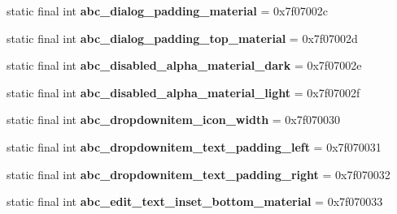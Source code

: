 \begin{DoxyCompactItemize}
\item 
\hypertarget{classandroid_1_1support_1_1design_1_1_r_1_1dimen_a520740e21ad1d52830d8977ff10afd5e}{}static final int {\bfseries abc\+\_\+dialog\+\_\+padding\+\_\+material} = 0x7f07002c\label{classandroid_1_1support_1_1design_1_1_r_1_1dimen_a520740e21ad1d52830d8977ff10afd5e}

\item 
\hypertarget{classandroid_1_1support_1_1design_1_1_r_1_1dimen_affd502ad3ee057bb26d6ce1cd4cc89b6}{}static final int {\bfseries abc\+\_\+dialog\+\_\+padding\+\_\+top\+\_\+material} = 0x7f07002d\label{classandroid_1_1support_1_1design_1_1_r_1_1dimen_affd502ad3ee057bb26d6ce1cd4cc89b6}

\item 
\hypertarget{classandroid_1_1support_1_1design_1_1_r_1_1dimen_a711065db6123eeca1bdda1feae6ee604}{}static final int {\bfseries abc\+\_\+disabled\+\_\+alpha\+\_\+material\+\_\+dark} = 0x7f07002e\label{classandroid_1_1support_1_1design_1_1_r_1_1dimen_a711065db6123eeca1bdda1feae6ee604}

\item 
\hypertarget{classandroid_1_1support_1_1design_1_1_r_1_1dimen_ad1756a425760ec484cfb76295400d4db}{}static final int {\bfseries abc\+\_\+disabled\+\_\+alpha\+\_\+material\+\_\+light} = 0x7f07002f\label{classandroid_1_1support_1_1design_1_1_r_1_1dimen_ad1756a425760ec484cfb76295400d4db}

\item 
\hypertarget{classandroid_1_1support_1_1design_1_1_r_1_1dimen_acc8d9f0a4c9277aa49a4c1cc8090c70e}{}static final int {\bfseries abc\+\_\+dropdownitem\+\_\+icon\+\_\+width} = 0x7f070030\label{classandroid_1_1support_1_1design_1_1_r_1_1dimen_acc8d9f0a4c9277aa49a4c1cc8090c70e}

\item 
\hypertarget{classandroid_1_1support_1_1design_1_1_r_1_1dimen_a968fc63b6429432c490e18cf8e1ae698}{}static final int {\bfseries abc\+\_\+dropdownitem\+\_\+text\+\_\+padding\+\_\+left} = 0x7f070031\label{classandroid_1_1support_1_1design_1_1_r_1_1dimen_a968fc63b6429432c490e18cf8e1ae698}

\item 
\hypertarget{classandroid_1_1support_1_1design_1_1_r_1_1dimen_aeec29d97219b2c603cdeb98e26965a7a}{}static final int {\bfseries abc\+\_\+dropdownitem\+\_\+text\+\_\+padding\+\_\+right} = 0x7f070032\label{classandroid_1_1support_1_1design_1_1_r_1_1dimen_aeec29d97219b2c603cdeb98e26965a7a}

\item 
\hypertarget{classandroid_1_1support_1_1design_1_1_r_1_1dimen_a0985e21f84e746dec037773a3abb1113}{}static final int {\bfseries abc\+\_\+edit\+\_\+text\+\_\+inset\+\_\+bottom\+\_\+material} = 0x7f070033\label{classandroid_1_1support_1_1design_1_1_r_1_1dimen_a0985e21f84e746dec037773a3abb1113}


\end{DoxyCompactItemize}
